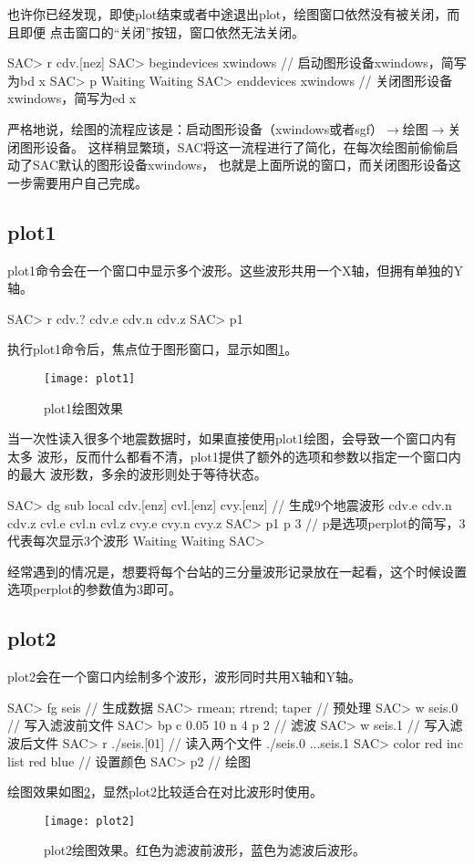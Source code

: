 也许你已经发现，即使plot结束或者中途退出plot，绘图窗口依然没有被关闭，而且即便
点击窗口的``关闭''按钮，窗口依然无法关闭。
\begin{SACCode}
SAC> r cdv.[nez]
SAC> begindevices xwindows      // 启动图形设备xwindows，简写为bd x
SAC> p
Waiting
Waiting
SAC> enddevices xwindows        // 关闭图形设备xwindows，简写为ed x
\end{SACCode}
严格地说，绘图的流程应该是：启动图形设备（xwindows或者sgf）$\rightarrow$绘图$\rightarrow$关闭图形设备。
这样稍显繁琐，SAC将这一流程进行了简化，在每次绘图前偷偷启动了SAC默认的图形设备xwindows，
也就是上面所说的窗口，而关闭图形设备这一步需要用户自己完成。

\subsection{plot1}
plot1命令会在一个窗口中显示多个波形。这些波形共用一个X轴，但拥有单独的Y轴。
\begin{SACCode}
SAC> r cdv.?
cdv.e cdv.n cdv.z
SAC> p1
\end{SACCode}
执行plot1命令后，焦点位于图形窗口，显示如图\ref{fig:plot1}。
\begin{figure}[H]
\centering
\texttt{[image: plot1]}
\caption{plot1绘图效果}
\label{fig:plot1}
\end{figure}

当一次性读入很多个地震数据时，如果直接使用plot1绘图，会导致一个窗口内有太多
波形，反而什么都看不清，plot1提供了额外的选项和参数以指定一个窗口内的最大
波形数，多余的波形则处于等待状态。
\begin{SACCode}
SAC> dg sub local cdv.[enz] cvl.[enz] cvy.[enz]  // 生成9个地震波形
cdv.e cdv.n cdv.z cvl.e cvl.n cvl.z cvy.e cvy.n cvy.z
SAC> p1 p 3         // p是选项perplot的简写，3代表每次显示3个波形
Waiting
Waiting
SAC> 
\end{SACCode}
经常遇到的情况是，想要将每个台站的三分量波形记录放在一起看，这个时候设置选项perplot的参数值为3即可。

\subsection{plot2}
plot2会在一个窗口内绘制多个波形，波形同时共用X轴和Y轴。
\begin{SACCode}
SAC> fg seis                     // 生成数据
SAC> rmean; rtrend; taper        // 预处理
SAC> w seis.0                    // 写入滤波前文件
SAC> bp c 0.05 10 n 4 p 2        // 滤波
SAC> w seis.1                    // 写入滤波后文件
SAC> r ./seis.[01]               // 读入两个文件
./seis.0 ...seis.1
SAC> color red inc list red blue // 设置颜色
SAC> p2                          // 绘图
\end{SACCode}
绘图效果如图\ref{fig:plot2}，显然plot2比较适合在对比波形时使用。

\begin{figure}[H]
\centering
\texttt{[image: plot2]}
\caption[plot2绘图效果]{plot2绘图效果。红色为滤波前波形，蓝色为滤波后波形。}
\label{fig:plot2}
\end{figure}
